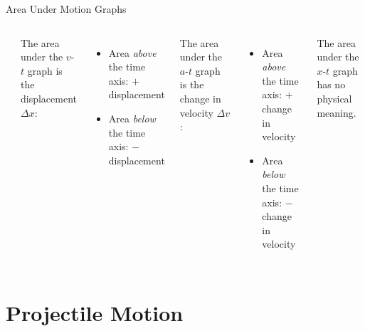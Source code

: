 \documentclass[12pt,compress,aspectratio=169]{beamer}
\begin{document}
\begin{frame}{Area Under Motion Graphs}
  \begin{columns}
    \begin{center}
    \end{center}
    
    The area under the $v$-$t$ graph is the displacement $\Delta x$:
    \begin{itemize}
    \item Area \textcolor{blue!20}{\emph{above}} the time axis: $+$
      displacement
    \item Area \textcolor{red!40}{\emph{below}} the time axis: $-$ displacement
    \end{itemize}
    \vspace{.1in}The area under the $a$-$t$ graph is the change in velocity
    $\Delta v$:
    \begin{itemize}
    \item Area \emph{above} the time axis: $+$ change in velocity
    \item Area \emph{below} the time axis: $-$ change in velocity
    \end{itemize}

    \vspace{.1in}The area under the $x$-$t$ graph has no physical meaning.
  \end{columns}
\end{frame}



\section{Projectile Motion}
\end{document}

